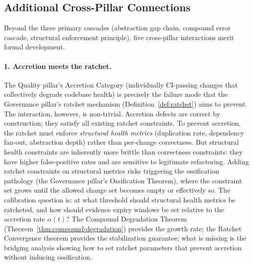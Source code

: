 \documentclass[11pt, a4paper, logo, copyright]{googledeepmind}
\begin{document}
\subsection{Additional Cross-Pillar Connections}
\label{sec:missed-connections}

Beyond the three primary cascades (abstraction gap chain, compound error cascade, structural enforcement principle), five cross-pillar interactions merit formal development.

\paragraph{1. Accretion meets the ratchet.}
The Quality pillar's Accretion Category (individually CI-passing changes that collectively degrade codebase health) is precisely the failure mode that the Governance pillar's ratchet mechanism (Definition~\ref{def:ratchet}) aims to prevent. The interaction, however, is non-trivial. Accretion defects are correct by construction; they satisfy all existing ratchet constraints. To prevent accretion, the ratchet must enforce \emph{structural health metrics} (duplication rate, dependency fan-out, abstraction depth) rather than per-change correctness. But structural health constraints are inherently more brittle than correctness constraints: they have higher false-positive rates and are sensitive to legitimate refactoring. Adding ratchet constraints on structural metrics risks triggering the ossification pathology (the Governance pillar's Ossification Theorem), where the constraint set grows until the allowed change set becomes empty or effectively so. The calibration question is: at what threshold should structural health metrics be ratcheted, and how should evidence expiry windows be set relative to the accretion rate $\alpha(t)$? The Compound Degradation Theorem (Theorem~\ref{thm:compound-degradation}) provides the growth rate; the Ratchet Convergence theorem provides the stabilization guarantee; what is missing is the bridging analysis showing how to set ratchet parameters that prevent accretion without inducing ossification.
\end{document}
